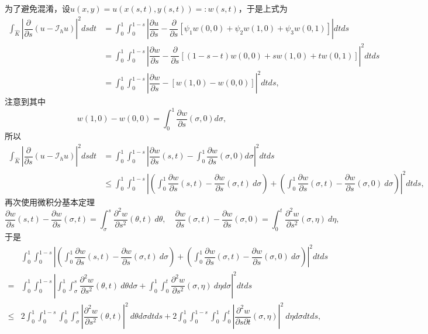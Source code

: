 \documentclass[a4paper,10pt]{ctexart}
\begin{document}
为了避免混淆，设$ u(x,y) = u(x(s,t),y(s,t))=:w(s,t) $，于是上式为
\[
    \begin{aligned}
        \int_{\hat{K}} \left\vert \dfrac{\partial }{\partial s} (u-\mathcal{I}_h u) \right\vert^2 dsdt
        &= \int_0^1 \int_0^{1-s} \left\vert \dfrac{\partial u}{\partial s} -\dfrac{\partial }{\partial s} [\psi_1w(0,0)+\psi_2w(1,0)+\psi_3w(0,1)] \right\vert dt ds \\
        &= \int_0^1 \int_0^{1-s} \left\vert \dfrac{\partial w}{\partial s} -\dfrac{\partial }{\partial s} [(1-s-t)w(0,0)+sw(1,0)+tw(0,1)] \right\vert^2 dt ds\\
        &= \int_0^1 \int_0^{1-s} \left\vert \dfrac{\partial w}{\partial s} -[w(1,0)-w(0,0)] \right\vert^2 dt ds,
    \end{aligned}
\]
注意到其中
\[
    w(1,0)-w(0,0) = \int_0^1 \dfrac{\partial w}{\partial s}(\sigma,0) d \sigma,
\]
所以
\[
    \begin{aligned}
        \int_{\hat{K}} \left\vert \dfrac{\partial }{\partial s} (u-\mathcal{I}_h u) \right\vert^2 dsdt
        &= \int_0^1 \int_0^{1-s} \left\vert \dfrac{\partial w}{\partial s}(s,t) -\int_0^1 \dfrac{\partial w}{\partial s}(\sigma,0) d \sigma \right\vert^2 dt ds\\
        &\leqslant \int_0^1 \int_0^{1-s} \left\vert \left( \int_0^1 \dfrac{\partial w}{\partial s}(s,t) - \dfrac{\partial w}{\partial s}(\sigma,t)\ d \sigma \right) + \left( \int_0^1 \dfrac{\partial w}{\partial s}(\sigma,t) - \dfrac{\partial w}{\partial s}(\sigma,0)\ d \sigma \right)   \right\vert^2 dt ds,
    \end{aligned}
\]
再次使用微积分基本定理
\[
    \dfrac{\partial w}{\partial s}(s,t) - \dfrac{\partial w}{\partial s}(\sigma,t) = \int_\sigma^s \dfrac{\partial^2 w}{\partial s^2}(\theta,t)\ d\theta, \quad \dfrac{\partial w}{\partial s}(\sigma,t) - \dfrac{\partial w}{\partial s}(\sigma,0) = \int_0^t \dfrac{\partial^2 w}{\partial s^2}(\sigma,\eta)\ d\eta,
\]
于是
\[
    \begin{aligned}
        &\int_0^1 \int_0^{1-s} \left\vert \left( \int_0^1 \dfrac{\partial w}{\partial s}(s,t) - \dfrac{\partial w}{\partial s}(\sigma,t)\ d \sigma \right) + \left( \int_0^1 \dfrac{\partial w}{\partial s}(\sigma,t) - \dfrac{\partial w}{\partial s}(\sigma,0)\ d \sigma \right)   \right\vert^2 dt ds \\
        =& \int_0^1 \int_0^{1-s} \left\vert \int_0^1 \int_\sigma^s \dfrac{\partial^2 w}{\partial s^2}(\theta,t)\ d\theta d \sigma + \int_0^1 \int_0^t \dfrac{\partial^2 w}{\partial s^2}(\sigma,\eta)\ d\eta d \sigma \right\vert^2 dt ds\\
        \leqslant &2\int_0^1 \int_0^{1-s}\int_0^1 \int_\sigma^s \left\vert \dfrac{\partial^2 w}{\partial {s}^2} (\theta,t) \right\vert^2\ d\theta d \sigma dt ds + 2\int_0^1 \int_0^{1-s}\int_0^1 \int_0^t \left\vert \dfrac{\partial^2 w}{\partial s \partial t} (\sigma,\eta) \right\vert^2\ d\eta d \sigma dt ds,
    \end{aligned}
\]
\end{document}
